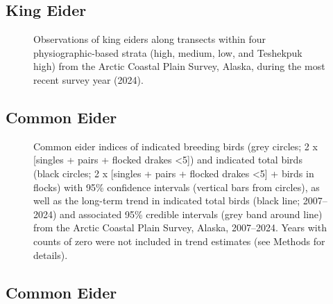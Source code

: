 \documentclass[
]{article}
\begin{document}
\endgroup{}

\newpage{}

\subsection*{King Eider}\label{king-eider-2}

\begin{figure}


\caption{\label{fig-KIEImap}Observations of king eiders along transects
within four physiographic-based strata (high, medium, low, and Teshekpuk
high) from the Arctic Coastal Plain Survey, Alaska, during the most
recent survey year (2024).}

\end{figure}%

\newpage{}

\subsection*{Common Eider}\label{common-eider}

\begin{figure}


\caption{\label{fig-COEI}Common eider indices of indicated breeding
birds (grey circles; 2 x {[}singles + pairs + flocked drakes
\textless5{]}) and indicated total birds (black circles; 2 x {[}singles
+ pairs + flocked drakes \textless5{]} + birds in flocks) with 95\%
confidence intervals (vertical bars from circles), as well as the
long-term trend in indicated total birds (black line; 2007--2024) and
associated 95\% credible intervals (grey band around line) from the
Arctic Coastal Plain Survey, Alaska, 2007--2024. Years with counts of
zero were not included in trend estimates (see Methods for details).}

\end{figure}%

\newpage{}

\subsection*{Common Eider}\label{common-eider-1}
\end{document}
